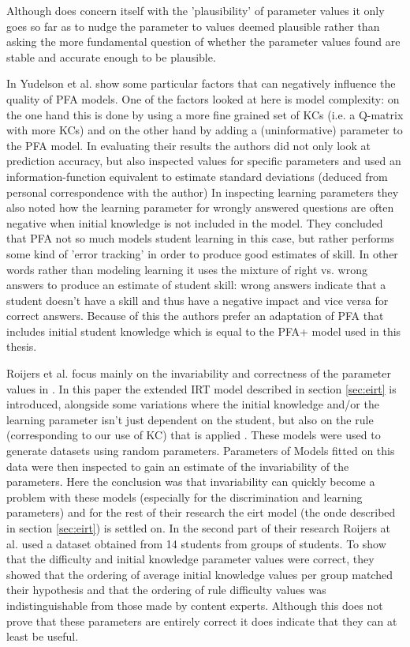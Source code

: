 \documentclass{scrartcl}
\begin{document}
Although \cite{knowledgeproblem} does concern itself with the 'plausibility' of parameter values it only goes so far as to nudge the parameter to values deemed plausible rather than asking the more fundamental question of whether the parameter values found are stable and accurate enough to be plausible.

In \cite{blackart} Yudelson et al. show some particular factors that can negatively influence the quality of PFA models. One of the factors looked at here is model complexity: on the one hand this is done by using a more fine grained set of KCs (i.e. a Q-matrix with more KCs) and on the other hand by adding a (uninformative) parameter to the PFA model. In evaluating their results the authors did not only look at prediction accuracy, but also inspected values for specific parameters and used an information-function equivalent to estimate standard deviations (deduced from personal correspondence with the author) In inspecting learning parameters they also noted how the learning parameter for wrongly answered questions are often negative when initial knowledge is not included in the model. They concluded that PFA not so much models student learning in this case, but rather performs some kind of 'error tracking' in order to produce good estimates of skill. In other words rather than modeling learning it uses the mixture of right vs. wrong answers to produce an estimate of student skill: wrong answers indicate that a student doesn't have a skill and thus have a negative impact and vice versa for correct answers. Because of this the authors prefer an adaptation of PFA that includes initial student knowledge which is equal to the PFA+ model used in this thesis.


Roijers et al. focus mainly on the invariability and correctness of the parameter values in \cite{eirt}. In this paper the extended IRT model described in section \ref{sec:eirt} is introduced, alongside some variations where the initial knowledge and/or the learning parameter isn't just dependent on the student, but also on the rule (corresponding to our use of KC) that is applied . These models were used to generate datasets using random parameters. Parameters of Models fitted on this data were then inspected to gain an estimate of the invariability of the parameters. Here the conclusion was that invariability can quickly become a problem with these models (especially for the discrimination and learning parameters) and for the rest of their research the eirt model (the onde described in section \ref{sec:eirt}) is settled on.
In the second part of their research Roijers at al. used a dataset obtained from 14 students from groups of students. To show that the difficulty and initial knowledge parameter values were correct, they showed that the ordering of average initial knowledge values per group matched their hypothesis and that the ordering of rule difficulty values was indistinguishable from those made by content experts. Although this does not prove that these parameters are entirely correct it does indicate that they can at least be useful.
\end{document}
